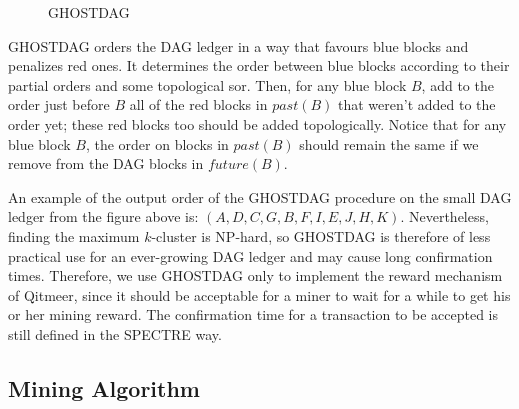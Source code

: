 \documentclass[a4paper,11pt]{article}
\begin{document}
\begin{figure}[ht]
	\centerline{%
	}
\caption{GHOSTDAG}
\end{figure}


GHOSTDAG orders the DAG ledger in a way that favours blue blocks and penalizes
red ones. It determines the order between blue blocks according to their partial orders and some topological sor. Then, for any blue block $B$, add to the order
just before $B$ all of the red blocks in $past(B)$ that weren’t added to the
order yet; these red blocks too should be added topologically. Notice
that for any blue block $B$, the order on blocks in $past(B)$ should remain the
same if we remove from the DAG blocks in $future(B)$.

An example of the output order of the GHOSTDAG procedure on the small DAG ledger
from the figure above is: $(A,D,C,G,B,F,I,E,J,H,K)$. Nevertheless, finding the
maximum $k$-cluster is NP-hard, so GHOSTDAG is therefore of less practical use
for an ever-growing DAG ledger and may cause long confirmation times.
Therefore, we use GHOSTDAG only to implement the reward mechanism of Qitmeer, since
it should be acceptable for a miner to wait for a while to get his or her mining
reward. The confirmation time for a transaction to be accepted is still defined
in the SPECTRE way.

\subsection{Mining Algorithm}
\end{document}
